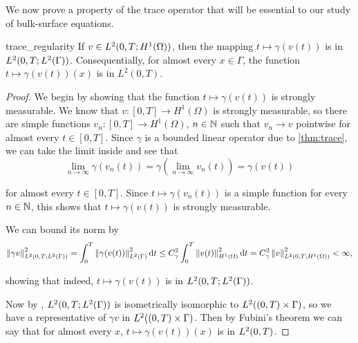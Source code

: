 We now prove a property of the trace operator that will be essential to our study of bulk-surface equations.

\begin{proposition}{}{trace_regularity}
    If $v \in L^2(0, T; H^1(\Omega))$, then the mapping $t \mapsto \gamma (v(t))$ is in $L^2(0, T; L^2(\Gamma))$. Consequentially, for almost every $x \in \Gamma$, the function $t \mapsto \gamma(v(t))(x)$ is in $L^2(0, T)$.
\end{proposition}

\begin{proof}
    We begin by showing that the function $t \mapsto \gamma(v(t))$ is strongly measurable. We know that $v: [0, T] \to H^1(\Omega)$ is strongly measurable, so there are simple functions $v_n: [0, T] \to H^1(\Omega)$, $n \in \mathbb{N}$ such that $v_n \to v$ pointwise for almost every $t \in [0, T]$. Since $\gamma$ is a bounded linear operator due to \cref{thm:trace}, we can take the limit inside and see that
    \begin{equation*}
        \lim_{n \to \infty} \gamma(v_n(t)) = \gamma \left( \lim_{n \to \infty} v_n(t) \right) = \gamma (v(t))
    \end{equation*}

    \noindent
    for almost every $t \in [0, T]$. Since $t \mapsto \gamma (v_n(t))$ is a simple function for every $n \in \mathbb{N}$, this shows that $t \mapsto \gamma(v(t))$ is strongly measurable.

    We can bound its norm by
%
    \begin{equation*}
        \left\| \gamma v \right\|_{L^2(0, T; L^2(\Gamma))}^2 = \int_{0}^{T} \left\| \gamma(v(t)) \right\|_{L^2(\Gamma)}^2 \mathop{}\!\mathrm{d} t \leq C_\gamma^2 \int_{0}^{T} \left\| v(t) \right\|_{H^1(\Omega)}^2 \mathop{}\!\mathrm{d} t = C_\gamma^2 \left\| v \right\|_{L^2(0, T; H^1(\Omega))}^2 < \infty,
    \end{equation*}

    \noindent
    showing that indeed, $t \mapsto \gamma (v(t))$ is in $L^2(0, T; L^2(\Gamma))$.

    Now by \cite{hytonen16}, $L^2(0, T; L^2(\Gamma))$ is isometrically isomorphic to $L^2((0, T) \times \Gamma)$, so we have a representative of $\gamma v$ in $L^2((0, T) \times \Gamma)$. Then by Fubini's theorem we can say that for almost every $x$, $t \mapsto \gamma (v(t))(x)$ is in $L^2(0, T)$.
\end{proof}